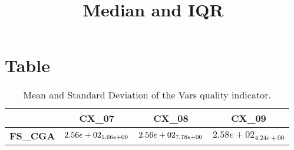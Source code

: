 \documentclass{article}
\title{Median and IQR}
\author{}
\begin{document}
\maketitle
\section{Table}
\begin{table}[!htp]
  \caption{Mean and Standard Deviation of the Vars quality indicator.}
  \label{table:Vars}
  \centering
  \begin{scriptsize}
  \begin{tabular}{c|ccc}
      & \textbf{CX\_07} & \textbf{CX\_08} & \textbf{CX\_09} \\\hline
      \textbf{FS_CGA} & $\cellcolor{gray95} 2.56e+02_{5.66e+00} $ & $ \cellcolor{gray25} 2.56e+02_{7.78e+00} $ & $ 2.58e+02_{4.24e+00}$ \\
  \end{tabular}
  \end{scriptsize}
\end{table}
\end{document}
